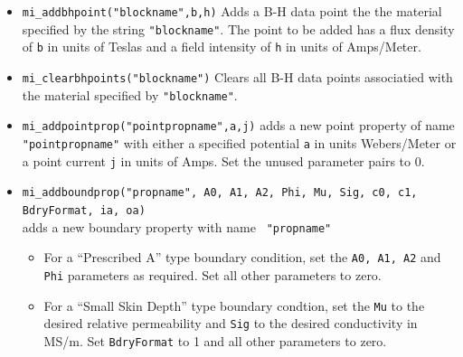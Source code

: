 \begin{itemize}
\begin{itemize}
\begin{itemize}
                                \item 8 -- 15\% copper-clad aluminum (CCA) wire
                \end{itemize}
        \item{\tt Phi\_hx} Hysteresis lag in degrees in the x-direction for linear problems.
        \item{\tt Phi\_hy} Hysteresis lag in degrees in the y-direction for linear problems.
                \item{\tt NStrands} Number of strands in the wire build.  Should be 1 for Magnet or Square wire.
                \item{\tt WireD} Diameter of each wire constituent strand in millimeters.
        \end{itemize}
Note that not all properties need be defined--properties that aren't defined are assigned default values.

\item{\tt mi\_addbhpoint("blockname",b,h)} Adds a B-H data point the
the material specified by the string {\tt "blockname"}.  The point to be added
has a flux density of {\tt b} in units of Teslas and a field
intensity of {\tt h} in units of Amps/Meter.

\item{\tt mi\_clearbhpoints("blockname")} Clears all B-H data points
associatied with the material specified by {\tt "blockname"}.

\item{\tt mi\_addpointprop("pointpropname",a,j)}
adds a new point property of name {\tt "pointpropname"} with either
a specified potential {\tt a} in units Webers/Meter
or a point current {\tt j} in units of Amps. Set the
unused parameter pairs to 0.

\item{\tt mi\_addboundprop("propname", A0, A1, A2, Phi, Mu, Sig, c0, c1,
BdryFormat, ia, oa)} \\ adds a new boundary property with name {\tt
"propname"}
        \begin{itemize}
        \item For a ``Prescribed A'' type boundary condition, set the {\tt A0,
        A1, A2} and {\tt Phi} parameters as required. Set all other
        parameters to zero.

        \item For a ``Small Skin Depth'' type boundary condtion, set the {\tt Mu}
        to the desired relative permeability and {\tt Sig} to the desired
        conductivity in MS/m.  Set {\tt BdryFormat} to 1 and all other
        parameters to zero.


\end{itemize}
\end{itemize}
